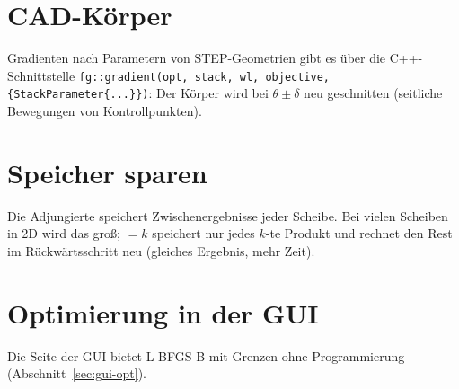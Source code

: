 \section{CAD-Körper}
Gradienten nach Parametern von STEP-Geometrien gibt es über die C++-Schnittstelle
\texttt{fg::gradient(opt, stack, wl, objective, \{StackParameter\{...\}\})}: Der Körper wird bei $\theta\pm\delta$
neu geschnitten (seitliche Bewegungen von Kontrollpunkten).

\section{Speicher sparen}
Die Adjungierte speichert Zwischenergebnisse jeder Scheibe. Bei vielen Scheiben in 2D wird das groß;
 $=k$ speichert nur jedes $k$-te Produkt und rechnet den Rest im Rückwärtsschritt neu
(gleiches Ergebnis, mehr Zeit).

\section{Optimierung in der GUI}
Die Seite  der GUI bietet L-BFGS-B mit Grenzen ohne Programmierung (Abschnitt~\ref{sec:gui-opt}).
